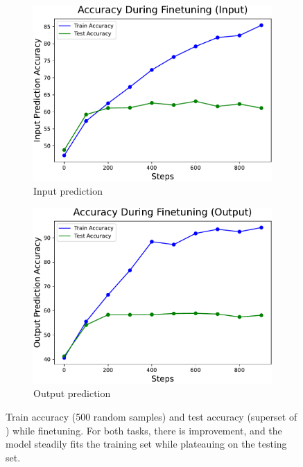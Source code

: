 \begin{figure}[H]
     \centering
     \begin{subfigure}[b]{0.48\textwidth}
         \centering
         \includegraphics[scale=0.4]{figs/finetuning/finetuning_input_accuracy.pdf}
         \caption{Input prediction}
         \label{fig:finetuning-accuracy-plot-input}
     \end{subfigure}
     \hfill
     \begin{subfigure}[b]{0.48\textwidth}
         \centering
         \includegraphics[scale=0.4]{figs/finetuning/finetuning_output_accuracy.pdf}
         \caption{Output prediction}
         \label{fig:finetuning-accuracy-plot-output}
     \end{subfigure}
     \caption{Train accuracy (500 random samples) and test accuracy (superset of \benchmark) while finetuning. For both tasks, there is improvement, and the model steadily fits the training set while plateauing on the testing set.}
     \label{fig:finetuning-accuracy-plot}
\end{figure}

